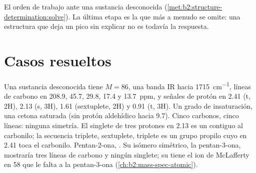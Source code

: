 \begin{omfigure}
\par\vspace{4pt}

{\small El orden de trabajo ante una sustancia desconocida (\cref{met:b2:structure-determination:solve}). La última etapa
es la que más a menudo se omite: una estructura que deja un pico sin explicar no es todavía la respuesta.}
\end{omfigure}

\section{Casos resueltos}

\begin{example}\label{ex:b2:structure-determination:ketone}
Una sustancia desconocida tiene $M = 86$, una banda IR hacia \qty{1715}{cm^{-1}}, líneas de carbono en 208.9, 45.7, 29.8, 17.4 y
13.7~ppm, y señales de protón en 2.41 (t, 2H), 2.13 (s, 3H), 1.61 (sextuplete, 2H) y 0.91 (t, 3H).
Un grado de insaturación, una cetona saturada (sin protón aldehídico hacia 9.7). Cinco carbonos, cinco líneas:
ninguna simetría. El singlete de tres protones en 2.13 es un  contiguo al carbonilo; la secuencia triplete,
sextuplete, triplete es un grupo propilo cuyo  en 2.41 toca el carbonilo. Pentan-2-ona,
. Su isómero simétrico, la pentan-3-ona, mostraría tres líneas de carbono y ningún singlete;
su  tiene el ion de McLafferty en 58 que le falta a la pentan-3-ona (\cref{ch:b2:mass-spec-atomic}).
\end{example}

